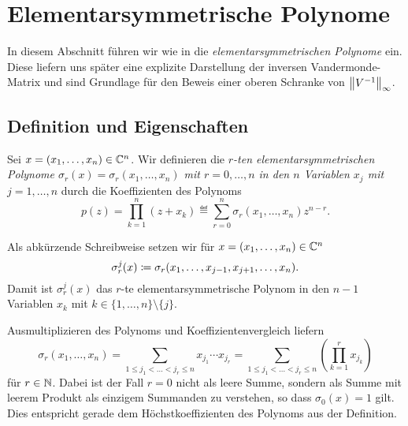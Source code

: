 \chapter{Elementarsymmetrische Polynome}

In diesem Abschnitt führen wir wie in \cite{gautschi5} die
\emph{elementarsymmetrischen Polynome} ein.
Diese liefern uns später eine explizite Darstellung der inversen
Vandermonde-Matrix und sind Grundlage für den Beweis einer oberen Schranke von
$\left\lVert V^{-1} \right\rVert_\infty$.

\section{Definition und Eigenschaften}

\begin{mydef}
    Sei $x = (x_1, \dots, x_{n}) \in \mathbb{C}^n$. Wir definieren die
    \emph{$r$-ten elementarsymmetrischen Polynome
    $\sigma_{r}(x) = \sigma_{r}(x_1, \dots, x_{n})$ mit $r = 0, \dots, n$
    in den $n$ Variablen $x_j$ mit $j = 1, \dots, n$} durch die Koeffizienten
    des Polynoms
    \[
        p(z)
        = \prod_{k=1}^{n} (z + x_k)
        \eqdef \sum_{r=0}^{n} \sigma_{r}(x_1, \dots, x_{n}) z^{n-r}.
    \]
\end{mydef}

\begin{notation}
    Als abkürzende Schreibweise setzen wir für
    ${x = (x_1, \dots, x_{n}) \in \mathbb{C}^n}$
    \[
        \sigma_{r}^{j}(x) \coloneqq \sigma_{r}(x_1, \dots, x_{j-1}, x_{j+1}, \dots, x_{n}).
    \]
    Damit ist $\sigma_{r}^{j}(x)$ das $r$-te elementarsymmetrische Polynom in den
    $n-1$ Variablen $x_k$ mit $k \in \{ 1, \dots, n \} \setminus \{ j \}$.
\end{notation}

\begin{remark}
    Ausmultiplizieren des Polynoms und Koeffizientenvergleich liefern
    \begin{equation}
        \label{eq:explicit_elementary_symmetric_polynomials}
        \sigma_{r}(x_1, \dots, x_{n})
        = \sum_{1 \leq j_1 < \dots < j_r \leq n} x_{j_1} \cdots x_{j_r}
        = \sum_{1 \leq j_1 < \dots < j_r \leq n} \left( \prod_{k=1}^r x_{j_k} \right)
    \end{equation}
    für $r \in \mathbb{N}$.
    Dabei ist der Fall $r = 0$ nicht als leere Summe, sondern als Summe mit
    leerem Produkt als einzigem Summanden zu verstehen, so dass
    $\sigma_0(x) = 1$ gilt. Dies entspricht gerade dem Höchstkoeffizienten des
    Polynoms aus der Definition.
\end{remark}


